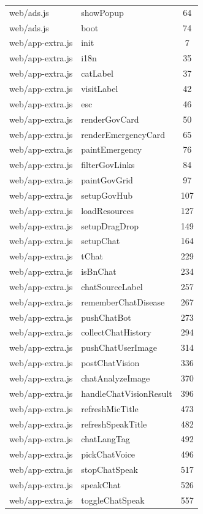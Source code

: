 \begin{center}
\begin{longtable}{@{}p{4.6cm}p{5.2cm}c@{}}
web/ads.js & showPopup & 64 \\
web/ads.js & boot & 74 \\
web/app-extra.js & init & 7 \\
web/app-extra.js & i18n & 35 \\
web/app-extra.js & catLabel & 37 \\
web/app-extra.js & visitLabel & 42 \\
web/app-extra.js & esc & 46 \\
web/app-extra.js & renderGovCard & 50 \\
web/app-extra.js & renderEmergencyCard & 65 \\
web/app-extra.js & paintEmergency & 76 \\
web/app-extra.js & filterGovLinks & 84 \\
web/app-extra.js & paintGovGrid & 97 \\
web/app-extra.js & setupGovHub & 107 \\
web/app-extra.js & loadResources & 127 \\
web/app-extra.js & setupDragDrop & 149 \\
web/app-extra.js & setupChat & 164 \\
web/app-extra.js & tChat & 229 \\
web/app-extra.js & isBnChat & 234 \\
web/app-extra.js & chatSourceLabel & 257 \\
web/app-extra.js & rememberChatDisease & 267 \\
web/app-extra.js & pushChatBot & 273 \\
web/app-extra.js & collectChatHistory & 294 \\
web/app-extra.js & pushChatUserImage & 314 \\
web/app-extra.js & postChatVision & 336 \\
web/app-extra.js & chatAnalyzeImage & 370 \\
web/app-extra.js & handleChatVisionResult & 396 \\
web/app-extra.js & refreshMicTitle & 473 \\
web/app-extra.js & refreshSpeakTitle & 482 \\
web/app-extra.js & chatLangTag & 492 \\
web/app-extra.js & pickChatVoice & 496 \\
web/app-extra.js & stopChatSpeak & 517 \\
web/app-extra.js & speakChat & 526 \\
web/app-extra.js & toggleChatSpeak & 557 \\

\end{longtable}
\end{center}
